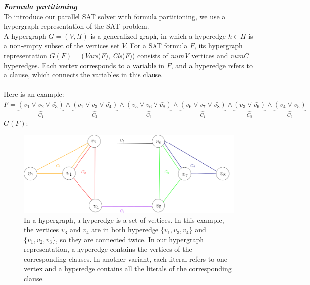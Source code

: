 \documentclass[12pt,a4paper,twoside]{scrartcl}
\numberwithin{equation}{section}
\begin{document}
\emph{\textbf{Formula partitioning}}\\
To introduce our parallel SAT solver with formula partitioning, we use a  hypergraph representation of the SAT problem. \\
A hypergraph $G = (V,H)$ is a generalized graph, in which a hyperedge $h \in H$ is a non-empty subset of the vertices set $V$. For a SAT formula $F$, its hypergraph representation $G(F)$ = (\emph{Vars}(\emph{F}), \emph{Cls}(\emph{F})) consists of \emph{numV} vertices and \emph{numC} hyperedges. 
  Each vertex corresponds to a variable in $F$, and a hyperedge refers to a clause, which connects the variables in this clause. \\
\\
Here is an example:\\
$F =\underbrace{(v_1 \lor v_2 \lor \bar{v_3})}_\text{$C_1$} \land \underbrace{(v_1 \lor v_3\lor \bar{v_4})}_\text{$C_2$}\land \underbrace{(v_5 \lor v_6\lor \bar{v_8})}_\text{$C_3$}\land \underbrace{(v_6 \lor v_7\lor \bar{v_8})}_\text{$C_4$}\land \underbrace{(v_3\lor \bar{v_6})}_\text{$C_5$}\land \underbrace{(v_4 \lor v_5)}_\text{$C_6$}$\\
$G(F)$:
\begin{figure}[H]
  \hspace{10cm}\includegraphics[scale = 0.4]{1/hypergraph1.png}
  \caption{In a hypergraph, a hyperedge is a set of vertices. In this example, the vertices  $v_3$  and $v_4$ are in both hyperedge $\{v_1, v_3, v_4\}$ and $\{v_1, v_2, v_3\}$, so they are connected twice. In our hypergraph representation, a hyperedge contains the vertices of the corresponding clauses. In another variant, each literal refers to one vertex and a hyperedge contains all the literals of the corresponding clause.}
  \label{hypergraph representation}
  \end{figure}
\end{document}
